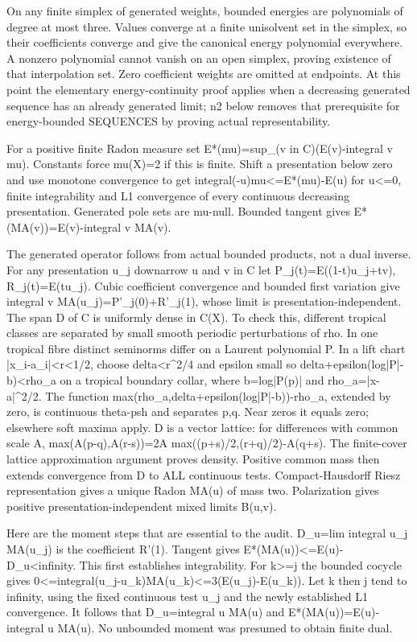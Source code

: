 \documentclass[11pt]{article}
\begin{document}
On any finite simplex of generated weights, bounded energies are polynomials of degree at most three. Values converge at a finite unisolvent set in the simplex, so their coefficients converge and give the canonical energy polynomial everywhere. A nonzero polynomial cannot vanish on an open simplex, proving existence of that interpolation set. Zero coefficient weights are omitted at endpoints. At this point the elementary energy-continuity proof applies when a decreasing generated sequence has an already generated limit; n2 below removes that prerequisite for energy-bounded SEQUENCES by proving actual representability.

For a positive finite Radon measure set E*(mu)=sup\_(v in C)(E(v)-integral v mu). Constants force mu(X)=2 if this is finite. Shift a presentation below zero and use monotone convergence to get integral(-u)mu<=E*(mu)-E(u) for u<=0, finite integrability and L1 convergence of every continuous decreasing presentation. Generated pole sets are mu-null. Bounded tangent gives E*(MA(v))=E(v)-integral v MA(v).

The generated operator follows from actual bounded products, not a dual inverse. For any presentation u\_j downarrow u and v in C let P\_j(t)=E((1-t)u\_j+tv), R\_j(t)=E(tu\_j). Cubic coefficient convergence and bounded first variation give integral v MA(u\_j)=P'\_j(0)+R'\_j(1), whose limit is presentation-independent. The span D of C is uniformly dense in C(X). To check this, different tropical classes are separated by small smooth periodic perturbations of rho. In one tropical fibre distinct seminorms differ on a Laurent polynomial P. In a lift chart |x\_i-a\_i|<r<1/2, choose delta<r\textasciicircum{}2/4 and epsilon small so delta+epsilon(log|P|-b)<rho\_a on a tropical boundary collar, where b=log|P(p)| and rho\_a=|x-a|\textasciicircum{}2/2. The function max(rho\_a,delta+epsilon(log|P|-b))-rho\_a, extended by zero, is continuous theta-psh and separates p,q. Near zeros it equals zero; elsewhere soft maxima apply. D is a vector lattice: for differences with common scale A, max(A(p-q),A(r-s))=2A max((p+s)/2,(r+q)/2)-A(q+s). The finite-cover lattice approximation argument proves density. Positive common mass then extends convergence from D to ALL continuous tests. Compact-Hausdorff Riesz representation gives a unique Radon MA(u) of mass two. Polarization gives positive presentation-independent mixed limits B(u,v).

Here are the moment steps that are essential to the audit. D\_u=lim integral u\_j MA(u\_j) is the coefficient R'(1). Tangent gives E*(MA(u))<=E(u)-D\_u<infinity. This first establishes integrability. For k>=j the bounded cocycle gives 0<=integral(u\_j-u\_k)MA(u\_k)<=3(E(u\_j)-E(u\_k)). Let k then j tend to infinity, using the fixed continuous test u\_j and the newly established L1 convergence. It follows that D\_u=integral u MA(u) and E*(MA(u))=E(u)-integral u MA(u). No unbounded moment was presumed to obtain finite dual.
\end{document}
